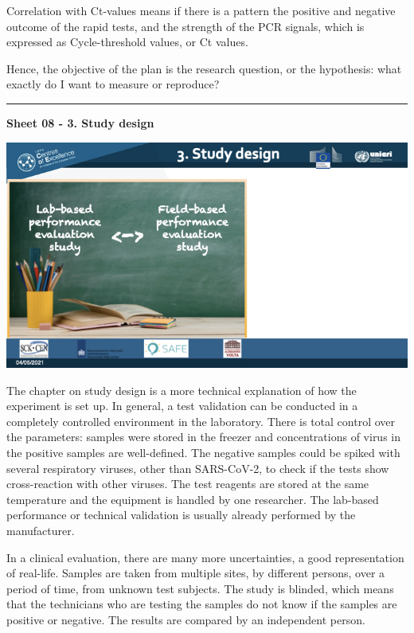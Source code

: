 \documentclass[
]{book}
\begin{document}
Correlation with Ct-values means if there is a pattern the positive and
negative outcome of the rapid tests, and the strength of the PCR
signals, which is expressed as Cycle-threshold values, or Ct values.

Hence, the objective of the plan is the research question, or the
hypothesis: what exactly do I want to measure or reproduce?

\begin{center}\rule{0.5\linewidth}{0.5pt}\end{center}

\textbf{Sheet 08 - 3. Study design}

\includegraphics{images/m03/m03_validation_of_test_kits_v2_2.008.jpeg}

The chapter on study design is a more technical explanation of how the
experiment is set up. In general, a test validation can be conducted in
a completely controlled environment in the laboratory. There is total
control over the parameters: samples were stored in the freezer and
concentrations of virus in the positive samples are well-defined. The
negative samples could be spiked with several respiratory viruses, other
than SARS-CoV-2, to check if the tests show cross-reaction with other
viruses. The test reagents are stored at the same temperature and the
equipment is handled by one researcher. The lab-based performance or
technical validation is usually already performed by the manufacturer.

In a clinical evaluation, there are many more uncertainties, a good
representation of real-life. Samples are taken from multiple sites, by
different persons, over a period of time, from unknown test subjects.
The study is blinded, which means that the technicians who are testing
the samples do not know if the samples are positive or negative. The
results are compared by an independent person.
\end{document}
